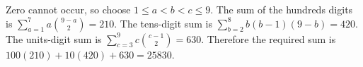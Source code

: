 Zero cannot occur, so choose $1\le a<b<c\le9$. The sum of the hundreds digits is $\sum_{a=1}^7a\binom{9-a}{2}=210$. The tens-digit sum is $\sum_{b=2}^8b(b-1)(9-b)=420$. The units-digit sum is $\sum_{c=3}^9c\binom{c-1}{2}=630$. Therefore the required sum is $100(210)+10(420)+630=\boxed{25830}$.
